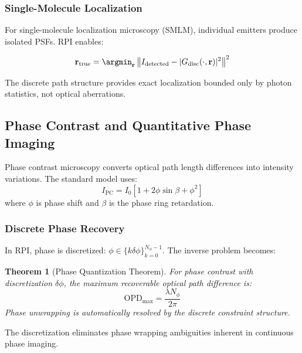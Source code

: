 \documentclass[twocolumn,10pt,a4paper]{article}
\newtheorem{theorem}{Theorem}[section]
\begin{document}
\subsubsection{Single-Molecule Localization}

For single-molecule localization microscopy (SMLM), individual emitters produce isolated PSFs. RPI enables:

\begin{equation}
\mathbf{r}_{\text{true}} = \argmin_{\mathbf{r}} \left\| I_{\text{detected}} - |G_{\text{disc}}(\cdot, \mathbf{r})|^2 \right\|^2
\end{equation}

The discrete path structure provides exact localization bounded only by photon statistics, not optical aberrations.

\subsection{Phase Contrast and Quantitative Phase Imaging}

Phase contrast microscopy converts optical path length differences into intensity variations. The standard model uses:
\begin{equation}
I_{\text{PC}} = I_0 \left[1 + 2\phi \sin\beta + \phi^2\right]
\end{equation}
where $\phi$ is phase shift and $\beta$ is the phase ring retardation.

\subsubsection{Discrete Phase Recovery}

In RPI, phase is discretized: $\phi \in \{k\delta\phi\}_{k=0}^{N_\phi-1}$. The inverse problem becomes:

\begin{theorem}[Phase Quantization Theorem]
For phase contrast with discretization $\delta\phi$, the maximum recoverable optical path difference is:
\begin{equation}
\text{OPD}_{\max} = \frac{\lambda N_\phi}{2\pi}
\end{equation}
Phase unwrapping is automatically resolved by the discrete constraint structure.
\end{theorem}

The discretization eliminates phase wrapping ambiguities inherent in continuous phase imaging.
\end{document}
